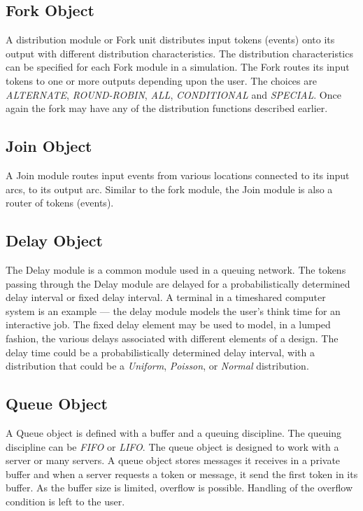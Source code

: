 \documentclass[11pt]{report}
\begin{document}
\subsection{Fork Object}

A distribution module or Fork unit distributes input tokens (events)
onto its output with different distribution characteristics.  The
distribution characteristics can be specified for each Fork module in a
simulation.  The Fork routes its input tokens to one or more outputs
depending upon the user.  The choices are {\it ALTERNATE},
{\it ROUND-ROBIN}, {\it ALL}, {\it CONDITIONAL} and {\it SPECIAL}.
Once again the fork may have any of the distribution functions described
earlier. 

\subsection{Join Object}

A Join module routes input events from various locations connected to
its input arcs, to its output arc.  Similar to the fork module, the Join
module is also a router of tokens (events).

\subsection{Delay Object}

The Delay module is a common module used in a queuing network.  The
tokens passing through the Delay module are delayed for a
probabilistically determined delay interval or fixed delay interval.  A
terminal in a timeshared computer system is an example --- the delay
module models the user's think time for an interactive job.  The fixed
delay element may be used to model, in a lumped fashion, the various
delays associated with different elements of a design.  The delay time
could be a probabilistically determined delay interval, with a
distribution that could be a {\it Uniform}, {\it Poisson}, or
{\it Normal} distribution. 

\subsection{Queue Object}

A Queue object is defined with a buffer and a queuing discipline.  The
queuing discipline can be {\it FIFO} or {\it LIFO}.  The queue object
is designed to work with a server or many servers.  A queue object
stores messages it receives in a private buffer and when a server
requests a token or message, it send the first token in its buffer.  As
the buffer size is limited, overflow is possible.  Handling of the
overflow condition is left to the user.
 
\end{document}
